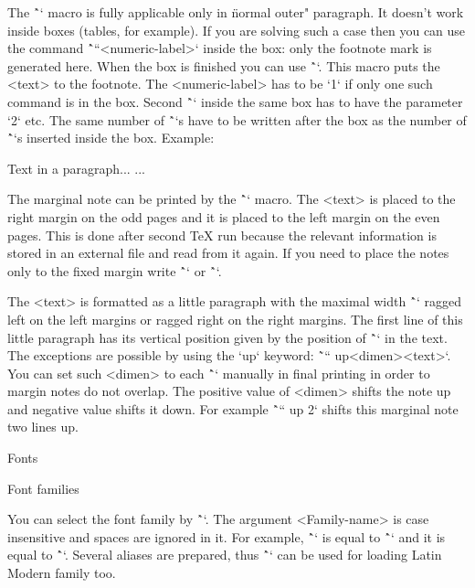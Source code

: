 The \^`\fnote` macro is fully applicable only in \"normal outer" paragraph.
It doesn't work inside boxes (tables, for example). If you are solving such
a case then you can use the command \^`\fnotemark``<numeric-label>` inside the box: only the
footnote mark is generated here. When the box is finished you can use
\^``. This macro puts the <text> to the footnote.
The <numeric-label> has to be `1` if only one such command is in the box.
Second \^`\fnotemark` inside the same box has to have the parameter `2` etc.
The same number of \^`\fnotetext`s have to be written
after the box as the number of \^`\fnotemark`s inserted inside the box.
Example:

\begtt
Text in a paragraph...    %
...
\endtt

The marginal note can be printed by the \^`` macro. The <text>
is placed to the right margin on the odd pages and it is placed to the left
margin on the even pages. This is done after second \TeX{} run because the
relevant information is stored in an external file and read from it again.
If you need to place the notes only to the fixed margin write
\^`\fixmnotes\right` or \^`\fixmnotes\left`.

The <text> is formatted as a little paragraph with the maximal width
\^`\mnotesize` ragged left on the left margins or ragged right on the right
margins. The first line of this little paragraph has its vertical position
given by the position of \^`\mnote` in the text. The exceptions are possible
by using the `up` keyword: \~`\mnote`` up<dimen>{<text>}`.
You can set such <dimen> to each \^`\mnote` manually in final printing
in order to margin notes do not overlap. The positive value of <dimen>
shifts the note up and negative value shifts it down. For example
\^`\mnote`` up 2\baselineskip{<text>}` shifts this marginal note two lines up.

\sec Fonts

\secc[fontfam] Font families

You can select the font family by \^``.
The argument <Family-name> is case insensitive and spaces are ignored in it. For
example, \^`\fontfam[LM Fonts]` is equal to \^`\fontfam[LMfonts]` and it is equal
to \^`\fontfam[lmfonts]`. Several aliases are prepared, thus
\^`` can be used for loading Latin Modern family too.

